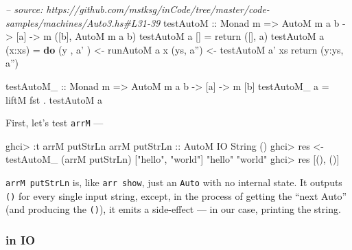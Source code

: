 \documentclass[]{article}
\newenvironment{Shaded}{}{}
\newcommand{\KeywordTok}[1]{\textcolor[rgb]{0.00,0.44,0.13}{\textbf{{#1}}}}
\newcommand{\DataTypeTok}[1]{\textcolor[rgb]{0.56,0.13,0.00}{{#1}}}
\newcommand{\StringTok}[1]{\textcolor[rgb]{0.25,0.44,0.63}{{#1}}}
\newcommand{\CommentTok}[1]{\textcolor[rgb]{0.38,0.63,0.69}{\textit{{#1}}}}
\newcommand{\OtherTok}[1]{\textcolor[rgb]{0.00,0.44,0.13}{{#1}}}
\newcommand{\FunctionTok}[1]{\textcolor[rgb]{0.02,0.16,0.49}{{#1}}}
\newcommand{\NormalTok}[1]{{#1}}
\begin{document}
\begin{Shaded}
\begin{Highlighting}[]
\CommentTok{-- source: https://github.com/mstksg/inCode/tree/master/code-samples/machines/Auto3.hs#L31-39}
\OtherTok{testAutoM ::} \DataTypeTok{Monad} \NormalTok{m }\OtherTok{=>} \DataTypeTok{AutoM} \NormalTok{m a b }\OtherTok{->} \NormalTok{[a] }\OtherTok{->} \NormalTok{m ([b], }\DataTypeTok{AutoM} \NormalTok{m a b)}
\NormalTok{testAutoM a []      }\FunctionTok{=} \NormalTok{return ([], a)}
\NormalTok{testAutoM a (x}\FunctionTok{:}\NormalTok{xs)  }\FunctionTok{=} \KeywordTok{do}
    \NormalTok{(y , a' ) }\OtherTok{<-} \NormalTok{runAutoM a x}
    \NormalTok{(ys, a'') }\OtherTok{<-} \NormalTok{testAutoM a' xs}
    \NormalTok{return (y}\FunctionTok{:}\NormalTok{ys, a'')}

\OtherTok{testAutoM_ ::} \DataTypeTok{Monad} \NormalTok{m }\OtherTok{=>} \DataTypeTok{AutoM} \NormalTok{m a b }\OtherTok{->} \NormalTok{[a] }\OtherTok{->} \NormalTok{m [b]}
\NormalTok{testAutoM_ a }\FunctionTok{=} \NormalTok{liftM fst }\FunctionTok{.} \NormalTok{testAutoM a}
\end{Highlighting}
\end{Shaded}

First, let's test \texttt{arrM} ---

\begin{Shaded}
\begin{Highlighting}[]
\NormalTok{ghci}\FunctionTok{>} \FunctionTok{:}\NormalTok{t arrM putStrLn}
\NormalTok{arrM}\OtherTok{ putStrLn ::} \DataTypeTok{AutoM} \DataTypeTok{IO} \DataTypeTok{String} \NormalTok{()}
\NormalTok{ghci}\FunctionTok{>} \NormalTok{res }\OtherTok{<-} \NormalTok{testAutoM_ (arrM putStrLn) [}\StringTok{"hello"}\NormalTok{, }\StringTok{"world"}\NormalTok{]}
\StringTok{"hello"}
\StringTok{"world"}
\NormalTok{ghci}\FunctionTok{>} \NormalTok{res}
\NormalTok{[(), ()]}
\end{Highlighting}
\end{Shaded}

\texttt{arrM\ putStrLn} is, like \texttt{arr\ show}, just an
\texttt{Auto} with no internal state. It outputs \texttt{()} for every
single input string, except, in the process of getting the ``next Auto''
(and producing the \texttt{()}), it emits a side-effect --- in our case,
printing the string.

\subsubsection{in IO}\label{in-io}
\end{document}

